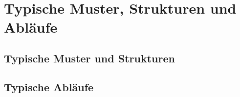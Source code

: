 \section{Typische Muster, Strukturen und Abläufe}

\subsection{Typische Muster und Strukturen}


\subsection{Typische Abläufe}
